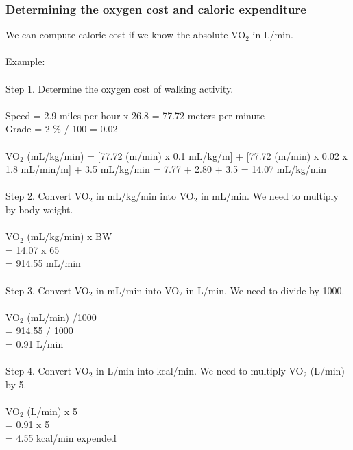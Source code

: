 \documentclass[12pt, a4paper]{report}   %
\begin{document}
\begin{enumerate}
\clearpage
\subsubsection{Determining the oxygen cost and caloric expenditure}
We can compute caloric cost if we know the absolute VO$_{2}$ in L/min.\\ \\
Example:\\ \\
Step 1. Determine the oxygen cost of walking activity.\\ \\
Speed = 2.9 miles per hour x 26.8 = 77.72 meters per minute\\
Grade = 2 \% / 100 = 0.02\\ \\
VO$_{2}$ (mL/kg/min) = [77.72 (m/min) x 0.1 mL/kg/m] +
          [77.72 (m/min) x 0.02 x 1.8 mL/min/m] +
          		         3.5 mL/kg/min
		      = 7.77  + 2.80 + 3.5
		      = 14.07 mL/kg/min\\ \\
Step 2. Convert VO$_{2}$ in mL/kg/min into VO$_{2}$ in mL/min. We need to multiply by body weight.\\ \\
VO$_{2}$ (mL/kg/min) x BW\\
= 14.07 x 65\\
= 914.55 mL/min\\ \\
Step 3. Convert VO$_{2}$ in mL/min into VO$_{2}$ in L/min. We need to divide by 1000.\\ \\
VO$_{2}$ (mL/min) /1000\\
= 914.55 / 1000\\
= 0.91 L/min\\ \\
Step 4. Convert VO$_{2}$ in L/min into kcal/min. We need to multiply VO$_{2}$ (L/min) by 5.\\ \\
VO$_{2}$ (L/min) x 5\\
= 0.91 x 5\\
= 4.55 kcal/min expended\\


\clearpage

\end{enumerate}
\end{document}
